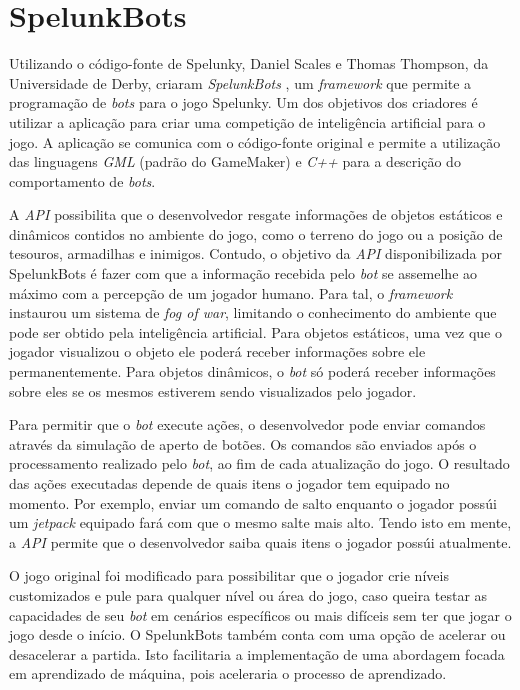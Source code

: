\section{SpelunkBots}
Utilizando o código-fonte de Spelunky, Daniel Scales e Thomas Thompson, da
Universidade de Derby, criaram \textit{SpelunkBots} \cite{SPELUNKBOTSWEB}, um
\textit{framework} que permite a programação de \textit{bots} para o jogo
Spelunky. Um dos objetivos dos criadores é utilizar a aplicação para criar uma
competição de inteligência artificial para o jogo. A aplicação se comunica com
o código-fonte original e permite a utilização das linguagens \textit{GML}
(padrão do GameMaker) e \textit{C++} para a descrição do comportamento de
\textit{bots}.

A \textit{API} possibilita que o desenvolvedor resgate informações de objetos
estáticos e dinâmicos contidos no ambiente do jogo, como o terreno do jogo ou a
posição de tesouros, armadilhas e inimigos. Contudo, o objetivo da \textit{API}
disponibilizada por SpelunkBots é fazer com que a informação recebida pelo
\textit{bot} se assemelhe ao máximo com a percepção de um jogador humano.  Para
tal, o \textit{framework} instaurou um sistema de \textit{fog of war},
limitando o conhecimento do ambiente que pode ser obtido pela inteligência
artificial.  Para objetos estáticos, uma vez que o jogador visualizou o objeto
ele poderá receber informações sobre ele permanentemente. Para objetos
dinâmicos, o \textit{bot} só poderá receber informações sobre eles se os mesmos
estiverem sendo visualizados pelo jogador.

Para permitir que o \textit{bot} execute ações, o desenvolvedor pode enviar
comandos através da simulação de aperto de botões. Os comandos são enviados
após o processamento realizado pelo \textit{bot}, ao fim de cada atualização do
jogo. O resultado das ações executadas depende de quais itens o jogador tem
equipado no momento. Por exemplo, enviar um comando de salto enquanto o jogador
possúi um \textit{jetpack} equipado fará com que o mesmo salte mais alto. Tendo
isto em mente, a \textit{API} permite que o desenvolvedor saiba quais itens o
jogador possúi atualmente.

O jogo original foi modificado para possibilitar que o jogador crie níveis
customizados e pule para qualquer nível ou área do jogo, caso queira testar as
capacidades de seu \textit{bot} em cenários específicos ou mais difíceis sem
ter que jogar o jogo desde o início. O SpelunkBots também conta com uma opção
de acelerar ou desacelerar a partida. Isto facilitaria a implementação de uma
abordagem focada em aprendizado de máquina, pois aceleraria o processo de
aprendizado.

